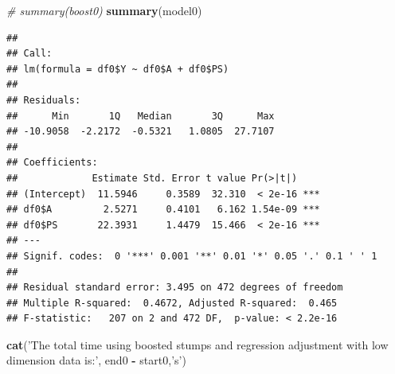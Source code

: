 \documentclass[]{article}
\newenvironment{Shaded}{\begin{snugshade}}{\end{snugshade}}
\newcommand{\CommentTok}[1]{\textcolor[rgb]{0.56,0.35,0.01}{\textit{#1}}}
\newcommand{\DataTypeTok}[1]{\textcolor[rgb]{0.13,0.29,0.53}{#1}}
\newcommand{\DecValTok}[1]{\textcolor[rgb]{0.00,0.00,0.81}{#1}}
\newcommand{\KeywordTok}[1]{\textcolor[rgb]{0.13,0.29,0.53}{\textbf{#1}}}
\newcommand{\NormalTok}[1]{#1}
\newcommand{\OperatorTok}[1]{\textcolor[rgb]{0.81,0.36,0.00}{\textbf{#1}}}
\newcommand{\StringTok}[1]{\textcolor[rgb]{0.31,0.60,0.02}{#1}}
\begin{document}
\begin{Shaded}
\end{Shaded}

\begin{Shaded}
\begin{Highlighting}[]
\CommentTok{# summary(boost0)}
\KeywordTok{summary}\NormalTok{(model0)}
\end{Highlighting}
\end{Shaded}

\begin{verbatim}
## 
## Call:
## lm(formula = df0$Y ~ df0$A + df0$PS)
## 
## Residuals:
##      Min       1Q   Median       3Q      Max 
## -10.9058  -2.2172  -0.5321   1.0805  27.7107 
## 
## Coefficients:
##             Estimate Std. Error t value Pr(>|t|)    
## (Intercept)  11.5946     0.3589  32.310  < 2e-16 ***
## df0$A         2.5271     0.4101   6.162 1.54e-09 ***
## df0$PS       22.3931     1.4479  15.466  < 2e-16 ***
## ---
## Signif. codes:  0 '***' 0.001 '**' 0.01 '*' 0.05 '.' 0.1 ' ' 1
## 
## Residual standard error: 3.495 on 472 degrees of freedom
## Multiple R-squared:  0.4672, Adjusted R-squared:  0.465 
## F-statistic:   207 on 2 and 472 DF,  p-value: < 2.2e-16
\end{verbatim}

\begin{Shaded}
\begin{Highlighting}[]
\KeywordTok{cat}\NormalTok{(}\StringTok{'The total time using boosted stumps and regression adjustment with low dimension }
\StringTok{    data is:'}\NormalTok{, end0 }\OperatorTok{-}\StringTok{ }\NormalTok{start0,}\StringTok{'s'}\NormalTok{)}
\end{Highlighting}
\end{Shaded}
\end{document}
